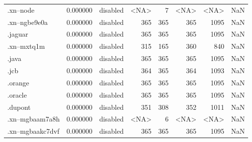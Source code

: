 \begin{tabular}{lrlrrrrl}
.xn--node                 &          0.000000 &        disabled &                        <NA> &                           7 &                        <NA> &                <NA> &                  NaN \\
.xn--ngbe9e0a             &          0.000000 &        disabled &                         365 &                         365 &                         365 &                1095 &                  NaN \\
.jaguar                   &          0.000000 &        disabled &                         365 &                         365 &                         365 &                1095 &                  NaN \\
.xn--mxtq1m               &          0.000000 &        disabled &                         315 &                         165 &                         360 &                 840 &                  NaN \\
.java                     &          0.000000 &        disabled &                         365 &                         365 &                         365 &                1095 &                  NaN \\
.jcb                      &          0.000000 &        disabled &                         364 &                         365 &                         364 &                1093 &                  NaN \\
.orange                   &          0.000000 &        disabled &                         365 &                         365 &                         365 &                1095 &                  NaN \\
.oracle                   &          0.000000 &        disabled &                         365 &                         365 &                         365 &                1095 &                  NaN \\
.dupont                   &          0.000000 &        disabled &                         351 &                         308 &                         352 &                1011 &                  NaN \\
.xn--mgbaam7a8h           &          0.000000 &        disabled &                        <NA> &                           6 &                        <NA> &                <NA> &                  NaN \\
.xn--mgbaakc7dvf          &          0.000000 &        disabled &                         365 &                         365 &                         365 &                1095 &                  NaN \\

\end{tabular}
